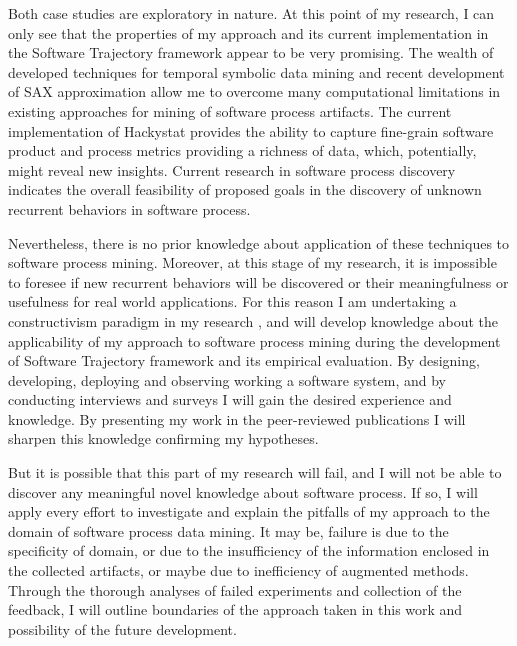 Both case studies are exploratory in nature. At this point of my research, I can only see that the properties of my approach and its current implementation in the Software Trajectory framework appear to be very promising. The wealth of developed techniques for temporal symbolic data mining and recent development of SAX approximation allow me to overcome many computational limitations in existing approaches for mining of software process artifacts. The current implementation of Hackystat provides the ability to capture fine-grain software product and process metrics providing a richness of data, which, potentially, might reveal new insights. Current research in software process discovery indicates the overall feasibility of proposed goals in the discovery of unknown recurrent behaviors in software process. 

Nevertheless, there is no prior knowledge about application of these techniques to software process mining. Moreover, at this stage of my research, it is impossible to foresee if new recurrent behaviors will be discovered or their meaningfulness or usefulness for real world applications. For this reason I am undertaking a constructivism paradigm in my research \cite{citeulike:209817}, and will develop knowledge about the applicability of my approach to software process mining during the development of Software Trajectory framework and its empirical evaluation. By designing, developing, deploying and observing working a software system, and by conducting interviews and surveys I will gain the desired experience and knowledge. By presenting my work in the peer-reviewed publications I will sharpen this knowledge confirming my hypotheses.

But it is possible that this part of my research will fail, and I will not be able to discover any meaningful novel knowledge about software process. If so, I will apply every effort to investigate and explain the pitfalls of my approach to the domain of software process data mining. It may be, failure is due to the specificity of domain, or due to the insufficiency of the information enclosed in the collected artifacts, or maybe due to inefficiency of augmented methods. Through the thorough analyses of failed experiments and collection of the feedback, I will outline boundaries of the approach taken in this work and possibility of the future development.
